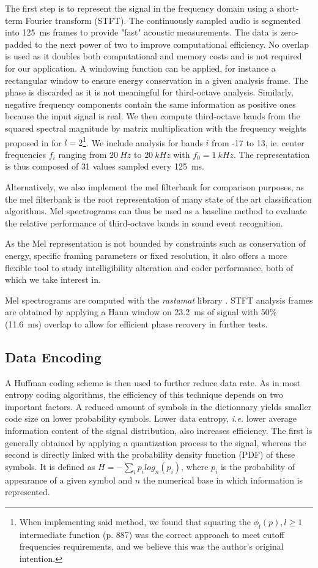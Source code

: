 \documentclass[final,3p,times,twocolumn]{elsarticle}
\begin{document}
The first step is to represent the signal in the frequency domain using a short-term Fourier transform (STFT). The continuously sampled audio is segmented into 125~ms frames to provide "fast" acoustic measurements. The data is zero-padded to the next power of two to improve computational efficiency. No overlap is used as it doubles both computational and memory costs and is not required for our application. A windowing function can be applied, for instance a rectangular window to ensure energy conservation in a given analysis frame. The phase is discarded as it is not meaningful for third-octave analysis. Similarly, negative frequency components contain the same information as positive ones because the input signal is real. We then compute third-octave bands from the squared spectral magnitude by matrix multiplication with the frequency weights proposed in \cite{antoni2010} for $l = 2$\footnote{When implementing said method, we found that squaring the $\phi_l(p), l \geq 1$ intermediate function (p. 887) was the correct approach to meet cutoff frequencies requirements, and we believe this was the author's original intention.}. We include analysis for bands $i$ from -17 to 13, ie. center frequencies $f_i$ ranging from $20~Hz$ to $20~kHz$ with $f_0 = 1~kHz$. The representation is thus composed of 31 values sampled every 125~ms.

Alternatively, we also implement the mel filterbank for comparison purposes, as the mel filterbank is the root representation of many state of the art classification algorithms. Mel spectrograms can thus be used as a baseline method to evaluate the relative performance of third-octave bands in sound event recognition.

As the Mel representation is not bounded by constraints such as conservation of energy, specific framing parameters or fixed resolution, it also offers a more flexible tool to study intelligibility alteration and coder performance, both of which we take interest in.

Mel spectrograms are computed with the \textit{rastamat} library \cite{ellis2005}. STFT analysis frames are obtained by applying a Hann window on 23.2~ms of signal with 50\% (11.6~ms) overlap to allow for efficient phase recovery in further tests.

\subsection{Data Encoding}

A Huffman coding scheme \cite{huffman1952} is then used to further reduce data rate. As in most entropy coding algorithms, the efficiency of this technique depends on two important factors. A reduced amount of symbols in the dictionnary yields smaller code size on lower probability symbols. Lower data entropy, \textit{i.e.} lower average information content of the signal distribution, also increases efficiency. The first is generally obtained by applying a quantization process to the signal, whereas the second is directly linked with the probability density function (PDF) of these symbols. It is defined as $H = -\sum\limits_i p_ilog_n(p_i)$, where $p_i$ is the probability of appearance of a given symbol and $n$ the numerical base in which information is represented.
\end{document}
